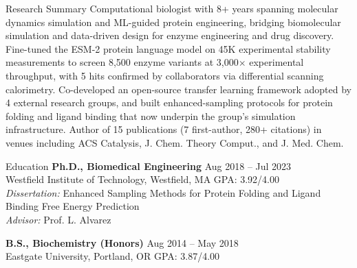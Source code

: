 \documentclass{cv}
\begin{document}
\vspace{-0.03cm}

\begin{rSection}{Research Summary}
Computational biologist with 8+ years spanning molecular dynamics simulation and ML-guided protein engineering, bridging biomolecular simulation and data-driven design for enzyme engineering and drug discovery. Fine-tuned the ESM-2 protein language model on 45K experimental stability measurements to screen 8,500 enzyme variants at 3,000$\times$ experimental throughput, with 5 hits confirmed by collaborators via differential scanning calorimetry. Co-developed an open-source transfer learning framework adopted by 4 external research groups, and built enhanced-sampling protocols for protein folding and ligand binding that now underpin the group's simulation infrastructure. Author of 15 publications (7 first-author, 280+ citations) in venues including ACS Catalysis, J. Chem. Theory Comput., and J. Med. Chem.
\end{rSection}
\vspace{-0.01cm}

\begin{rSection}{Education}
\textbf{Ph.D., Biomedical Engineering} \hfill {Aug 2018 -- Jul 2023}\\
Westfield Institute of Technology, Westfield, MA \hfill GPA: 3.92/4.00\\
\textit{Dissertation:} Enhanced Sampling Methods for Protein Folding and Ligand Binding Free Energy Prediction\\
\textit{Advisor:} Prof. L. Alvarez

\textbf{B.S., Biochemistry (Honors)} \hfill {Aug 2014 -- May 2018}\\
Eastgate University, Portland, OR \hfill GPA: 3.87/4.00
\end{rSection}
\vspace{-0.0cm}
\end{document}
